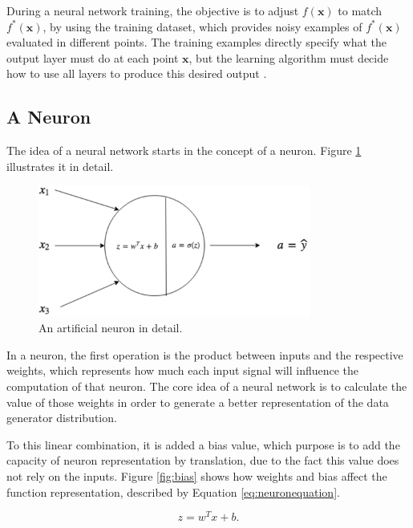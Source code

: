 During a neural network training, the objective is to adjust \(f(\mathrm{\mathbf{x}})\) to match \(f^{*}(\mathrm{\mathbf{x}})\), by using the training dataset, which provides noisy examples of \(f^{*}(\mathrm{\mathbf{x}})\) evaluated in different points. The training examples directly specify what the output layer must do at each point \(\mathrm{\mathbf{x}}\), but the learning algorithm must decide how to use all layers to produce this desired output \cite{Goodfellow-et-al-2016}.

\subsection{A Neuron}\label{sec:neuron}

The idea of a neural network starts in the concept of a neuron. Figure \ref{fig:neurondetail} illustrates it in detail.

\begin{figure}[!htbp]
	\centering
	\includegraphics[width=0.8\textwidth]{Cap3/neurondetail.eps}
	\caption{An artificial neuron in detail.}
	\label{fig:neurondetail}
\end{figure}

In a neuron, the first operation is the product between inputs and the respective weights, which represents how much each input signal will influence the computation of that neuron. The core idea of a neural network is to calculate the value of those weights in order to generate a better representation of the data generator distribution.

To this linear combination, it is added a bias value, which purpose is to add the capacity of neuron representation by translation, due to the fact this value does not rely on the inputs. Figure \ref{fig:bias} shows how weights and bias affect the function representation, described by Equation \ref{eq:neuronequation}.


\begin{equation}
z = w^{T}x + b.
\label{eq:neuronequation}
\end{equation}



